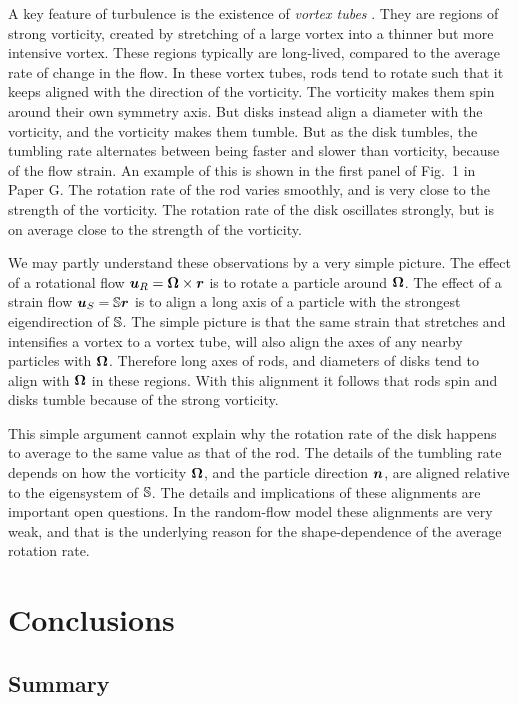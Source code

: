 \documentclass[thesis.tex]{subfiles}
\begin{document}
A key feature of turbulence is the existence of \emph{vortex tubes} \cite{she1990}. They are regions of strong vorticity, created by stretching of a large vortex into a thinner but more intensive vortex. These regions typically are long-lived, compared to the average rate of change in the flow. In these vortex tubes, rods tend to rotate such that it keeps aligned with the direction of the vorticity. The vorticity makes them spin around their own symmetry axis. But disks instead align a diameter with the vorticity, and the vorticity makes them tumble. But as the disk tumbles, the tumbling rate alternates between being faster and slower than vorticity, because of the flow strain. An example of this is shown in the first panel of Fig.~1 in Paper G. The rotation rate of the rod varies smoothly, and is very close to the strength of the vorticity. The rotation rate of the disk oscillates strongly, but is on average close to the strength of the vorticity.

We may partly understand these observations by a very simple picture. The effect of a rotational flow $\mbox{\boldmath$u$}_R= \mbox{\boldmath$\Omega$} \times \mbox{\boldmath$r$}$ is to rotate a particle around $\mbox{\boldmath$\Omega$}$. The effect of a strain flow $\mbox{\boldmath$u$}_S=\mathbb{S} \mbox{\boldmath$r$}$ is to align a long axis of a particle with the strongest eigendirection of $\mathbb{S}$. The simple picture is that the same strain that stretches and intensifies a vortex to a vortex tube, will also align the axes of any nearby particles with $\mbox{\boldmath$\Omega$}$. Therefore long axes of rods, and diameters of disks tend to align with $\mbox{\boldmath$\Omega$}$ in these regions. With this alignment it follows that rods spin and disks tumble because of the strong vorticity.

This simple argument cannot explain why the rotation rate of the disk happens to average to the same value as that of the rod. The details of the tumbling rate depends on how the vorticity $\mbox{\boldmath$\Omega$}$, and the particle direction $\mbox{\boldmath$n$}$, are aligned relative to the eigensystem of $\mathbb{S}$. The details and implications of these alignments are important open questions. In the random-flow model these alignments are very weak, and that is the underlying reason for the shape-dependence of the average rotation rate.

\chapter{Conclusions}

\section{Summary}
\end{document}
